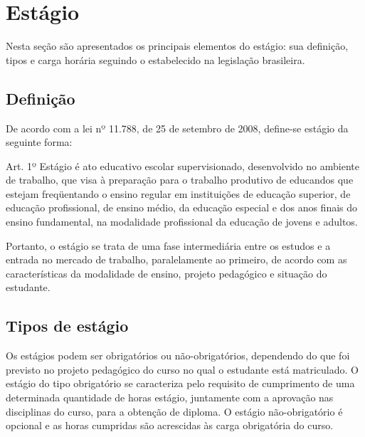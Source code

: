 \section{Estágio}
Nesta seção são apresentados os principais elementos do estágio: sua definição, tipos e carga horária seguindo o estabelecido na legislação brasileira.
\subsection{Definição}
De acordo com a lei nº 11.788, de 25 de setembro de 2008, define-se estágio da seguinte forma:
\begin{quoting}[rightmargin=0cm,leftmargin=4cm]
	\begin{SingleSpace}
	{\footnotesize
	Art. 1º  Estágio é ato educativo escolar supervisionado, desenvolvido no ambiente de trabalho, que visa à preparação para o trabalho produtivo de educandos que estejam freqüentando o ensino regular em instituições de educação superior, de educação profissional, de ensino médio, da educação especial e dos anos finais do ensino fundamental, na modalidade profissional da educação de jovens e adultos. \cite{leiestagio}
	}
	\end{SingleSpace}
\end{quoting}

Portanto, o estágio se trata de uma fase intermediária entre os estudos e a entrada no mercado de trabalho, paralelamente ao primeiro, de acordo com as características da modalidade de ensino, projeto pedagógico e situação do estudante.

\subsection{Tipos de estágio}
Os estágios podem ser obrigatórios ou não-obrigatórios, dependendo do que foi previsto no projeto pedagógico do curso no qual o estudante está matriculado. O estágio do tipo obrigatório se caracteriza pelo requisito de cumprimento de uma determinada quantidade de horas estágio, juntamente com a aprovação nas disciplinas do curso, para a obtenção de diploma. O estágio não-obrigatório é opcional e as horas cumpridas são acrescidas às carga obrigatória do curso. \cite{leiestagio}

